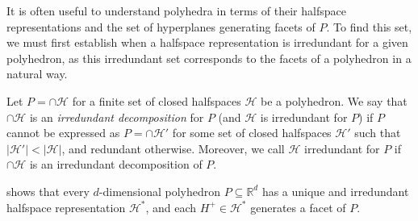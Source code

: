\documentclass[twoside,11pt]{article}
\newcommand{\reals}{\mathbb{R}}
\renewcommand{\H}{\mathcal{H}}
\begin{document}
It is often useful to understand polyhedra in terms of their halfspace representations and the set of hyperplanes generating facets of $P$.
To find this set, we must first establish when a halfspace representation is irredundant for a given polyhedron, as this irredundant set corresponds to the facets of a polyhedron in a natural way.

\begin{definition}\label{def:irredundant}
	Let $P = \cap \H$ for a finite set of closed halfspaces $\H$ be a polyhedron.
	We say that $\cap \H$ is an \emph{irredundant decomposition} for $P$ (and $\H$ is irredundant for $P$) if $P$ cannot be expressed as $P = \cap \H'$ for some set of closed halfspaces $\H'$ such that $|\H'| < |\H|$, and redundant otherwise.
	Moreover, we call $\H$ irredundant for $P$ if $\cap \H$ is an irredundant decomposition of $P$.
\end{definition}

\citet{gallier2008notes} shows that every $d$-dimensional polyhedron $P \subseteq \reals^d$ has a unique and irredundant halfspace representation $\H^*$, and each $H^+ \in \H^*$ generates a facet of $P$.
\end{document}
